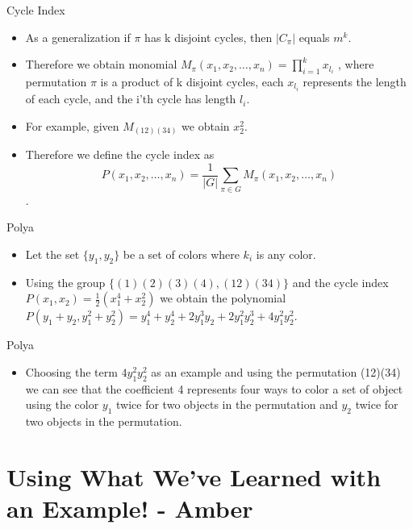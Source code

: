 \documentclass{beamer}
\begin{document}
\begin{frame}{Cycle Index}
\begin{itemize}
\item As a generalization if $\pi$ has k disjoint cycles, then $\vert C_{\pi}\vert$ equals $m^k$.
\item Therefore we obtain monomial $M_{\pi}(x_{1}, x_{2}, \ldots,x_{n}) = \displaystyle \prod_{i=1}^{k}x_{l_{i}}$ , where permutation $\pi$ is a product of k disjoint cycles, each $x_{l_{i}}$ represents the length of each cycle, and the i'th cycle has length $l_{i}$.
\item For example, given $M_{(12)(34)}$ we obtain $x_{2}^{2}$.
\item Therefore we define the cycle index as $$P(x_{1}, x_{2}, \ldots,x_{n})=\frac{1}{|G|}\sum_{\pi\in G}M_{\pi}(x_{1}, x_{2}, \ldots,x_{n})$$.
\end{itemize}
\end{frame}

%
%
\begin{frame}{Polya}
\begin{itemize}
\item Let the set $\{y_{1}, y_{2}\}$ be a set of colors where $k_{i}$ is any color.
\item Using the group $\{(1)(2)(3)(4), (12)(34)\}$ and the cycle index $P(x_{1},x_{2}) = \frac{1}{2}(x_{1}^{4} + x_{2}^{2})$ we obtain the polynomial $P(y_{1}+y_{2} , y_{1}^{2}+y_{2}^{2}) = y_{1}^{4} + y_{2}^{4} + 2y_{1}^{3}y_{2} + 2y_{1}^{2}y_{2}^{3} + 4y_{1}^{2}y_{2}^{2}$.
\end{itemize}
\end{frame}

%
%
\begin{frame}{Polya}
\begin{itemize}
\item Choosing the term $4y_{1}^{2}y_{2}^{2}$ as an example and using the permutation (12)(34) we can see that the coefficient 4 represents four ways to color a set of object using the color $y_{1}$ twice for two objects in the permutation and $y_{2}$ twice for two objects in the permutation.
\end{itemize}
\end{frame}

\section{Using What We've Learned with an Example! - Amber}
\end{document}
